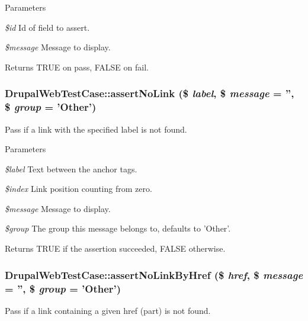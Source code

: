 \begin{DoxyParams}{Parameters}
\item[{\em \$id}]Id of field to assert. \item[{\em \$message}]Message to display. \end{DoxyParams}
\begin{DoxyReturn}{Returns}
TRUE on pass, FALSE on fail. 
\end{DoxyReturn}
\hypertarget{classDrupalWebTestCase_aebe9c02edc5edcf8e0b97d5c9742070b}{
\subsubsection[{assertNoLink}]{\setlength{\rightskip}{0pt plus 5cm}DrupalWebTestCase::assertNoLink (\$ {\em label}, \/  \$ {\em message} = {\ttfamily ''}, \/  \$ {\em group} = {\ttfamily 'Other'})}}
\label{classDrupalWebTestCase_aebe9c02edc5edcf8e0b97d5c9742070b}
Pass if a link with the specified label is not found.


\begin{DoxyParams}{Parameters}
\item[{\em \$label}]Text between the anchor tags. \item[{\em \$index}]Link position counting from zero. \item[{\em \$message}]Message to display. \item[{\em \$group}]The group this message belongs to, defaults to 'Other'. \end{DoxyParams}
\begin{DoxyReturn}{Returns}
TRUE if the assertion succeeded, FALSE otherwise. 
\end{DoxyReturn}
\hypertarget{classDrupalWebTestCase_a7babab352277932e47debf3cb29f4b80}{
\subsubsection[{assertNoLinkByHref}]{\setlength{\rightskip}{0pt plus 5cm}DrupalWebTestCase::assertNoLinkByHref (\$ {\em href}, \/  \$ {\em message} = {\ttfamily ''}, \/  \$ {\em group} = {\ttfamily 'Other'})}}
\label{classDrupalWebTestCase_a7babab352277932e47debf3cb29f4b80}
Pass if a link containing a given href (part) is not found.


